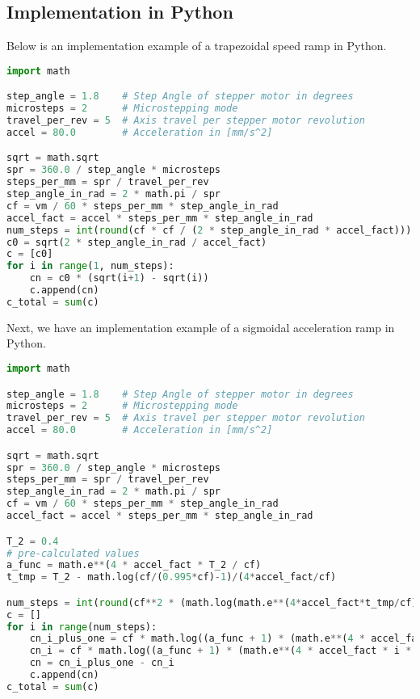 \documentclass[hidelinks, 11pt, fleqn]{article}   	%
\begin{document}
\subsection{Implementation in Python}
Below is an implementation example of a trapezoidal speed ramp in Python.
\begin{lstlisting}[language=Python, caption=Python example of trapezodial speed ramp calculation]
import math

step_angle = 1.8    # Step Angle of stepper motor in degrees
microsteps = 2      # Microstepping mode
travel_per_rev = 5  # Axis travel per stepper motor revolution
accel = 80.0        # Acceleration in [mm/s^2]

sqrt = math.sqrt
spr = 360.0 / step_angle * microsteps
steps_per_mm = spr / travel_per_rev
step_angle_in_rad = 2 * math.pi / spr
cf = vm / 60 * steps_per_mm * step_angle_in_rad
accel_fact = accel * steps_per_mm * step_angle_in_rad
num_steps = int(round(cf * cf / (2 * step_angle_in_rad * accel_fact)))
c0 = sqrt(2 * step_angle_in_rad / accel_fact)
c = [c0]
for i in range(1, num_steps):
	cn = c0 * (sqrt(i+1) - sqrt(i))
	c.append(cn)
c_total = sum(c)
\end{lstlisting}
Next, we have an implementation example of a sigmoidal acceleration ramp in Python.
\newline
\begin{lstlisting}[language=Python, caption=Python example of sigmoidal speed ramp calculation]
import math

step_angle = 1.8    # Step Angle of stepper motor in degrees
microsteps = 2      # Microstepping mode
travel_per_rev = 5  # Axis travel per stepper motor revolution
accel = 80.0        # Acceleration in [mm/s^2]

sqrt = math.sqrt
spr = 360.0 / step_angle * microsteps
steps_per_mm = spr / travel_per_rev
step_angle_in_rad = 2 * math.pi / spr
cf = vm / 60 * steps_per_mm * step_angle_in_rad
accel_fact = accel * steps_per_mm * step_angle_in_rad

T_2 = 0.4
# pre-calculated values
a_func = math.e**(4 * accel_fact * T_2 / cf)
t_tmp = T_2 - math.log(cf/(0.995*cf)-1)/(4*accel_fact/cf)

num_steps = int(round(cf**2 * (math.log(math.e**(4*accel_fact*t_tmp/cf) + a_func) - math.log(a_func + 1)) / (4 * accel_fact * step_angle_in_rad)))
c = []
for i in range(num_steps):
	cn_i_plus_one = cf * math.log((a_func + 1) * (math.e**(4 * accel_fact * (i+1) * step_angle_in_rad / cf**2)) - a_func) / (4 * accel_fact)
	cn_i = cf * math.log((a_func + 1) * (math.e**(4 * accel_fact * i * step_angle_in_rad / cf**2)) - a_func) / (4 * accel_fact)
	cn = cn_i_plus_one - cn_i
	c.append(cn)
c_total = sum(c)
\end{lstlisting}
\pagebreak
\end{document}
